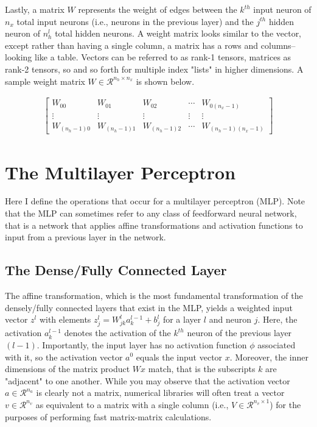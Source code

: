 \documentclass{article}
\begin{document}
Lastly, a matrix $W$ represents the weight of edges between the $k^{th}$
input neuron of $n_x$ total input neurons (i.e., neurons in the previous layer)
and the $j^{th}$ hidden neuron of $n_h^{l}$ total hidden neurons.
A weight matrix looks similar to the vector, except rather than having a single
column, a matrix has a rows and columns--looking like a table. Vectors can
be referred to as rank-1 tensors, matrices as rank-2 tensors, so and so forth
for multiple index "lists" in higher dimensions. A sample weight matrix
$W \in \mathcal{R}^{n_h \times n_x}$ is
shown below.

\begin{align}
	\begin{bmatrix}
		W_{00}         & W_{01}         & W_{02}         & \cdots & W_{0(n_{x}-1)}         \\
		\vdots         & \vdots         & \vdots         & \vdots & \vdots                 \\
		W_{(n_{h}-1)0} & W_{(n_{h}-1)1} & W_{(n_{h}-1)2} & \cdots & W_{(n_{h}-1)(n_{x}-1)}
	\end{bmatrix}
\end{align}

\section{The Multilayer Perceptron}
\quad Here I define the operations that occur for a multilayer perceptron (MLP).
Note that the MLP can sometimes refer to any class of feedforward
neural network, that is a network that applies affine transformations and
activation functions to input from a previous layer in the network.

\subsection{The Dense/Fully Connected Layer}
The affine transformation, which is the most fundamental transformation
of the densely/fully connected layers that exist in the MLP, yields
a weighted input vector $z^{l}$ with elements
$z_j^{l} = W_{jk}^{l} a_{k}^{l-1} + b_{j}^{l}$ for a layer $l$ and neuron $j$.
Here, the activation $a_k^{l-1}$ denotes the activation of the $k^{th}$ neuron of the
previous layer $(l-1)$. Importantly, the input layer has no activation function $\phi$
associated with it, so the activation vector $a^{0}$ equals the input vector $x$.
Moreover, the inner dimensions of the matrix product
$Wx$ match, that is the subscripts $k$ are "adjacent" to one another. While you may
observe that the activation vector $a \in \mathcal{R}^{n_a}$ is clearly not a matrix,
numerical libraries will often treat a vector $v \in \mathcal{R}^{n_v}$ as equivalent
to a matrix with a single column (i.e., $V \in \mathcal{R}^{n_v \times 1}$) for
the purposes of performing fast matrix-matrix calculations.
\end{document}
